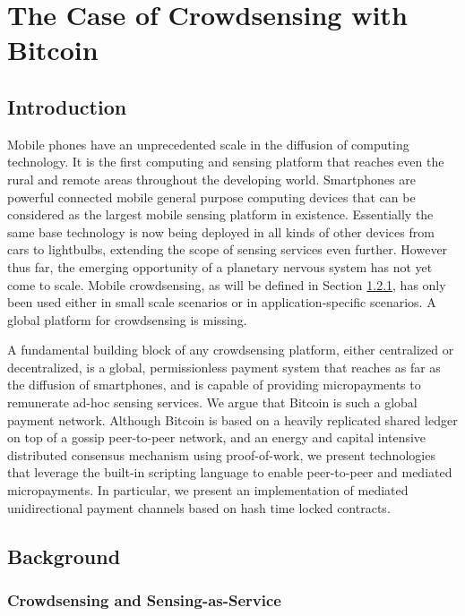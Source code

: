 \chapter{The Case of Crowdsensing with Bitcoin}
\section{Introduction}

Mobile phones have an unprecedented scale in the diffusion of computing technology. It is the first computing and sensing platform that reaches even the rural and remote areas throughout the developing world. Smartphones are powerful connected mobile general purpose computing devices that can be considered as the largest mobile sensing platform in existence. Essentially the same base technology is now being deployed in all kinds of other devices from cars to lightbulbs, extending the scope of sensing services even further. However thus far, the emerging opportunity of a planetary nervous system \cite{giannotti2012planetary} has not yet come to scale. Mobile crowdsensing, as will be defined in Section \ref{sec:crowdsensing}, has only been used either in small scale scenarios or in application-specific scenarios. A global platform for crowdsensing is missing.

 A fundamental building block of any crowdsensing platform, either centralized or decentralized, is a global, permissionless payment system that reaches as far as the diffusion of smartphones, and is capable of providing micropayments to remunerate ad-hoc sensing services. We argue that Bitcoin is such a global payment network. Although Bitcoin is based on a heavily replicated shared ledger on top of a gossip peer-to-peer network, and an energy and capital intensive distributed consensus mechanism using proof-of-work, we present technologies that leverage the built-in scripting language to enable peer-to-peer and mediated micropayments. In particular, we present an implementation of mediated unidirectional payment channels based on hash time locked contracts.


\section{Background}

\subsection{Crowdsensing and Sensing-as-Service}
\label{sec:crowdsensing}

